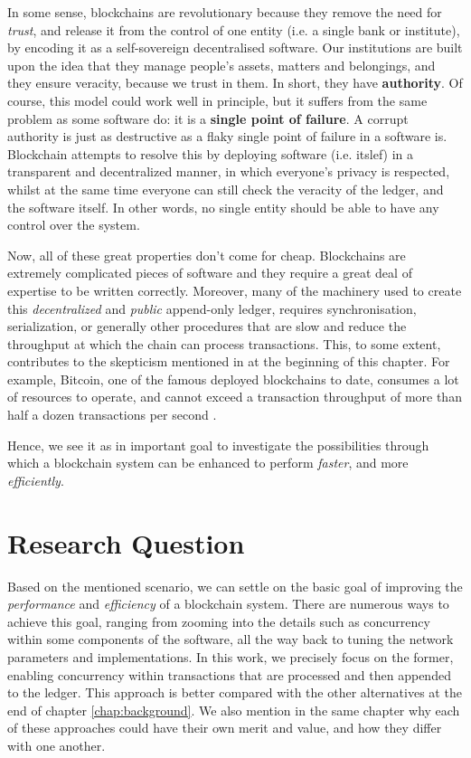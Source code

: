 In some sense, blockchains are revolutionary because they remove the need for \textit{trust}, and release it from the control of one entity (i.e. a single bank or institute), by encoding it as a self-sovereign decentralised software. Our institutions are built upon the idea that they manage people's assets, matters and belongings, and they ensure veracity, because we trust in them. In short, they have \textbf{authority}. Of course, this model could work well in principle, but it suffers from the same problem as some software do: it is a \textbf{single point of failure}. A corrupt authority is just as destructive as a flaky single point of failure in a software is. Blockchain attempts to resolve this by deploying software (i.e. itslef) in a transparent and decentralized manner, in which everyone's privacy is respected, whilst at the same time everyone can still check the veracity of the ledger, and the software itself. In other words, no single entity should be able to have any control over the system.

Now, all of these great properties don't come for cheap. Blockchains are extremely complicated pieces of software and they require a great deal of expertise to be written correctly. Moreover, many of the machinery used to create this \textit{decentralized} and \textit{public} append-only ledger, requires synchronisation, serialization, or generally other procedures that are slow and reduce the throughput at which the chain can process transactions. This, to some extent, contributes to the skepticism mentioned in at the beginning of this chapter. For example, Bitcoin, one of the famous deployed blockchains to date, consumes a lot of resources to operate, and cannot exceed a transaction throughput of more than half a dozen transactions per second \cite{security_of_bitcoin}.

Hence, we see it as in important goal to investigate the possibilities through which a blockchain system can be enhanced to perform \textit{faster}, and more \textit{efficiently}. 

\section{Research Question} \label{chap_intro:sec:resarch_q}

Based on the mentioned scenario, we can settle on the basic goal of improving the \textit{performance} and \textit{efficiency} of a blockchain system. There are numerous ways to achieve this goal, ranging from zooming into the details such as concurrency within some components of the software, all the way back to tuning the network parameters and implementations. In this work, we precisely focus on the former, enabling concurrency within transactions that are processed and then appended to the ledger. This approach is better compared with the other alternatives at the end of chapter \ref{chap:background}. We also mention in the same chapter why each of these approaches could have their own merit and value, and how they differ with one another.
 
